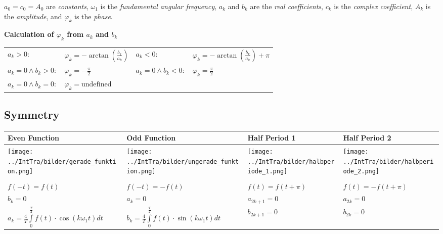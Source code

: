 	$a_0=c_0=A_0$ are \textit{constants}, $\omega_1$ is the
    \textit{fundamental angular frequency}, $a_k$ and $b_k$ are the \textit{real
    coefficients}, $c_k$ is the \textit{complex coefficient}, $A_k$ is the
    \textit{amplitude}, and $\varphi_k$ is the \textit{phase}.\\

	\textbf{Calculation of $\varphi_k$ from $a_k$ and $b_k$}\\
    \begin{tabular}{p{4cm}p{4cm}p{3cm}p{3.5cm}}
        $a_k> 0:$ & $\varphi_k = -\arctan(\frac{b_k}{a_k})$ &
        $a_k<0:$ &    $\varphi_k = -\arctan(\frac{b_k}{a_k}) + \pi$\\
        $a_k = 0 \wedge b_k > 0:$ &    $\varphi_k = -\frac{\pi}{2}$ &
        $a_k = 0 \wedge b_k < 0:$ &    $\varphi_k = \frac{\pi}{2}$\\
        $a_k = 0 \wedge b_k = 0:$ &    $\varphi_k = \text{undefined}$
    \end{tabular}

	\subsection{Symmetry}
        \begin{tabular}{|p{4.3cm}|p{4.3cm}|p{4.4cm}|p{4.4cm}|}
            \hline
            \textbf{Even Function} & \textbf{Odd Function} &
            \textbf{Half Period 1} & \textbf{Half Period 2}\\
            \hline
            \texttt{[image: ../IntTra/bilder/gerade\_funktion.png]}&
            \texttt{[image: ../IntTra/bilder/ungerade\_funktion.png]}&
            \texttt{[image: ../IntTra/bilder/halbperiode\_1.png]}&
            \texttt{[image: ../IntTra/bilder/halbperiode\_2.png]}\\
            \hline & & & \\
            $f(-t)=f(t)$ & $f(-t)=-f(t)$ & $f(t)=f(t+\pi)$ & $f(t)=-f(t+\pi)$\\
            $b_k=0$ & $a_k=0$ & $a_{2k+1}=0$ & $a_{2k}=0$\\
            $a_k = \frac{4}{T} \int\limits_0^{\frac{T}{2}} f(t) \cdot \cos(k \omega_1
            t) dt$ &
            $b_k =  \frac{4}{T} \int\limits_0^{\frac{T}{2}} f(t) \cdot
            \sin(k \omega_1 t) dt$ &
            $b_{2k+1}=0$ & $b_{2k}=0$\\
            \hline
        \end{tabular}

